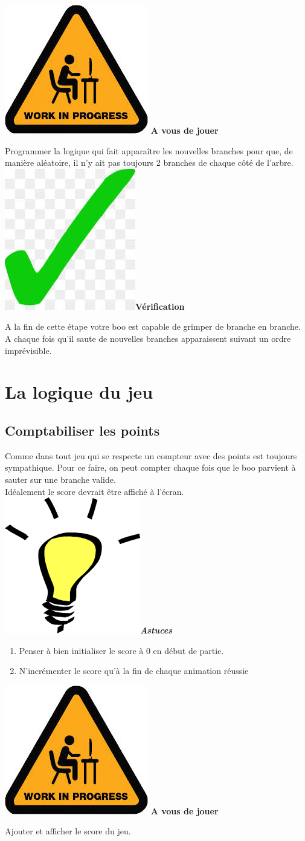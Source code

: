 \documentclass[french]{article}
\newcommand{\tips}{\includegraphics[scale=0.08]{tips}\textbf{\textit{Astuces\\}}}
\newcommand{\todo}{\includegraphics[scale=0.1]{work_in_progress}\textbf{ A vous de jouer\\} }
\newcommand{\result}{\includegraphics[scale=0.1]{green_tick}\textbf{Vérification\\}}
\begin{document}
\todo

Programmer la logique qui fait apparaître les nouvelles branches pour que, de manière aléatoire, il n'y ait pas toujours 2 branches de chaque côté de l'arbre.\\

\result

A la fin de cette étape votre boo est capable de grimper de branche en branche. A chaque fois qu'il saute de nouvelles branches apparaissent suivant un ordre imprévisible.

\newpage

\section{La logique du jeu}

\begin{abstract}
	Nous avons jusqu'à présent programmé tous les éléments visibles. Cependant, il n'est toujours pas possible à ce stade ni de gagner, ni de perdre. En effet, même si votre personnage saute du côté où il n'y a pas de branche, rien ne se passe. Il est donc à présent temps de passer à la logique opérationnelle du jeu elle-même.
\end{abstract}

\subsection{Comptabiliser les points}

Comme dans tout jeu qui se respecte un compteur avec des points est toujours sympathique. Pour ce faire, on peut compter chaque fois que le boo parvient à sauter sur une branche valide.\\

Idéalement le score devrait être affiché à l'écran.\\

\tips

\begin{enumerate}

\item Penser à bien initialiser le score à 0 en début de partie.

\item N'incrémenter le score qu'à la fin de chaque animation réussie\\

\end{enumerate}	

\todo

Ajouter et afficher le score du jeu.\\
\end{document}
